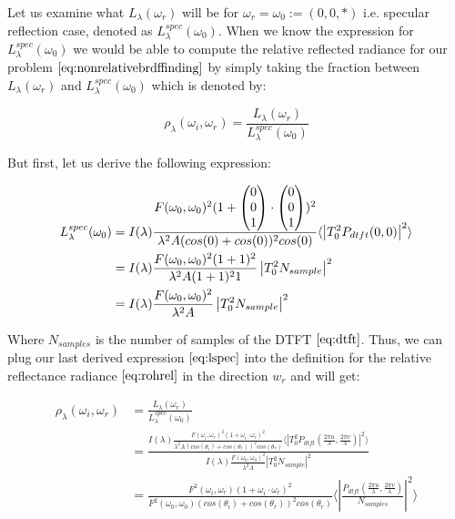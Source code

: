 Let us examine what $L_\lambda(\omega_r)$ will be for $\omega_r = \omega_0 := (0,0,*)$ i.e. specular reflection case, denoted as $L_\lambda^{spec}(\omega_0)$. When we know the expression for $L_\lambda^{spec}(\omega_0)$ we would be able to compute the relative reflected radiance for our problem $\ref{eq:nonrelativebrdffinding}$ by simply taking the fraction between $L_\lambda(\omega_r)$ and $L_\lambda^{spec}(\omega_0)$ which is denoted by: 

\begin{equation}
  \rho_\lambda(\omega_i,\omega_r) = \frac{L_\lambda(\omega_r)}{L_\lambda^{spec}(\omega_0)}
  \label{eq:rohrel}
\end{equation}

But first, let us derive the following expression:

\begin{align}
L_\lambda^{spec}(\omega_0) 
& = I(\lambda) \frac{F(\omega_0, \omega_0)^2 (1+\colvec[0]{0}{1}\cdot\colvec[0]{0}{1})^2}{\lambda^2 A (cos(0)+cos(0))^2 cos(0)} \langle \left|T_0^2 P_{dtft}(0,0)  \right|^2\rangle \nonumber \\
& = I(\lambda) \frac{F(\omega_0, \omega_0)^2 (1+1)^2}{\lambda^2 A (1+1)^2 1}\left| T_0^2 N_{sample} \right|^2 \nonumber \\
& = I(\lambda) \frac{F(\omega_0, \omega_0)^2}{\lambda^2 A}\left| T_0^2 N_{sample} \right|^2 
\label{eq:lspec}
\end{align}

Where $N_{samples}$ is the number of samples of the DTFT $\ref{eq:dtft}$. Thus, we can plug our last derived expression $\ref{eq:lspec}$ into the definition for the relative reflectance radiance $\ref{eq:rohrel}$ in the direction $w_r$ and will get:

\begin{align}
\rho_\lambda(\omega_i,\omega_r)
& = \frac{L_\lambda(\omega_r)}{L_\lambda^{spec}(\omega_0)} \nonumber \\
& = \frac{I(\lambda) \frac{F(\omega_i, \omega_r)^2 (1 + \omega_i \cdot \omega_r)^2}{\lambda^2 A (cos(\theta_i)+cos(\theta_r))^2 cos(\theta_r)} \langle \left|T_0^2 P_{dtft}(\frac{2\pi u}{\lambda}, \frac{2\pi v}{\lambda}) \right|^2\rangle}{I(\lambda) \frac{F(\omega_0, \omega_0)^2}{\lambda^2 A}\left| T_0^2 N_{sample} \right|^2 } \nonumber \\
& = \frac{F^2(\omega_i,\omega_r)(1 + \omega_i \cdot \omega_r)^2}{F^2(\omega_0,\omega_0)(cos(\theta_i)+cos(\theta_r))^2 cos(\theta_r)} \langle \left|\frac{P_{dtft}(\frac{2\pi u}{\lambda}, \frac{2\pi v}{\lambda})}{N_{samples}}\right|^2\rangle
\label{eq:lspecrohrel}
\end{align}

